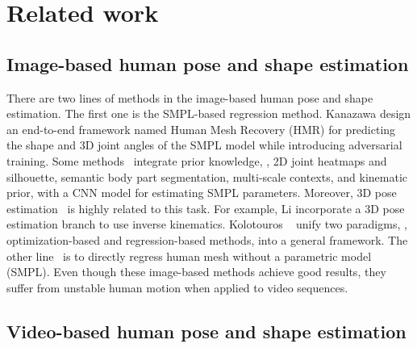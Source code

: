 \documentclass[10pt,twocolumn,letterpaper]{article}
\begin{document}
	\section{Related work}
	\subsection{Image-based human pose and shape estimation}
	There are two lines of methods in the image-based human pose and shape estimation. The first one is the SMPL-based regression method. 
	Kanazawa \etal \cite{HMR} design an end-to-end framework named Human Mesh Recovery (HMR) for predicting the shape and 3D joint angles of the SMPL model while introducing adversarial training.
	Some methods~\cite{GeorgiosPavlakos2018LearningTE, GeorgiosGeorgakis2020HierarchicalKH, MohamedOmran2018NeuralBF, PARE, zhang2021pymaf} integrate prior knowledge, \ie, 2D joint heatmaps and silhouette, semantic body part segmentation, multi-scale contexts, and kinematic prior, with a CNN model for estimating SMPL parameters. Moreover, 3D pose estimation~\cite{GeorgiosPavlakos2016CoarsetoFineVP, MPII3D} is highly related to this task. For example, Li \etal \cite{li2021hybrik} incorporate a 3D pose estimation branch to use inverse kinematics.
	Kolotouros \etal~\cite{SPIN} unify two paradigms, \ie, optimization-based and regression-based methods, into a general framework.
	The other line~\cite{GraphCMR, moon2020i2l, metro_lin} is to directly regress human mesh without a parametric model (SMPL).
Even though these image-based methods achieve good results, they suffer from unstable human motion when applied to video sequences. 
	
	\subsection{Video-based human pose and shape estimation}
	
\end{document}
